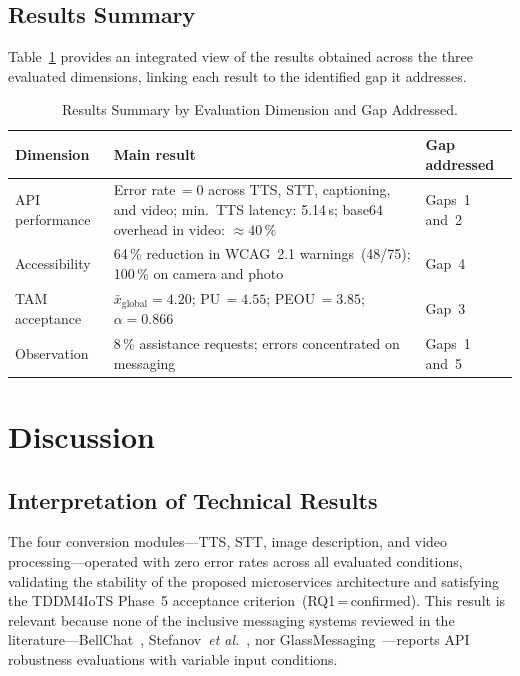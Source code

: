 \documentclass[journal]{IEEEtran}
\begin{document}
	\subsection{Results Summary}
	Table~\ref{tab:sintesis} provides an integrated view of the
	results obtained across the three evaluated dimensions,
	linking each result to the identified gap it addresses.
	
	\begin{table}[!t]
		\caption{Results Summary by Evaluation Dimension and Gap Addressed.}
		\label{tab:sintesis}
		\centering
		\small
		\renewcommand{\arraystretch}{1.25}
		\begin{tabular}{p{2.0cm}p{2.8cm}p{2.5cm}}
			\toprule
			\textbf{Dimension} & \textbf{Main result} & \textbf{Gap addressed} \\
			\midrule
			API performance   & Error rate\,$=0$ across TTS, STT, captioning, and video; min.\ TTS latency: 5.14\,s; base64 overhead in video: ${\approx}40\,\%$ & Gaps~1 and~2 \\
			Accessibility    & 64\,\% reduction in WCAG~2.1 warnings~(48/75); 100\,\% on camera and photo & Gap~4 \\
			TAM acceptance   & $\bar{x}_{\text{global}}{=}4.20$; PU\,$=4.55$; PEOU\,$=3.85$; $\alpha{=}0.866$ & Gap~3 \\
			Observation      & 8\,\% assistance requests; errors concentrated on messaging & Gaps~1 and~5 \\
			\bottomrule
		\end{tabular}
	\end{table}
	
	\section{Discussion}
	\label{sec:discussion}
	
	\subsection{Interpretation of Technical Results}
	The four conversion modules---TTS, STT, image description, and
	video processing---operated with zero error rates across all
	evaluated conditions, validating the stability of the proposed
	microservices architecture and satisfying the TDDM4IoTS
	Phase~5 acceptance criterion~(RQ1\,=\,confirmed).
	This result is relevant because none of the inclusive messaging
	systems reviewed in the literature---BellChat~\cite{guerrero2021bellchat},
	Stefanov~\textit{et al.}~\cite{stefanov2024}, nor
	GlassMessaging~\cite{janaka2023}---reports API robustness
	evaluations with variable input conditions.
	
\end{document}
